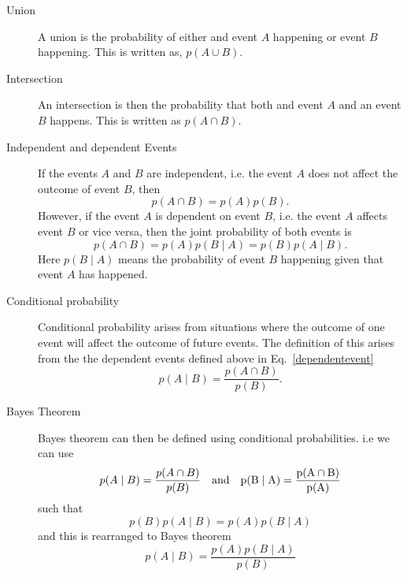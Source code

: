 \begin{description}
	\item [Union]
	A union is the probability of either and event $A$ happening or event $B$ happening. This is written as, $p(A \cup B)$.
	
	\item [Intersection]
	An intersection is then the probability that both and event $A$ and an event $B$ happens. This is written as $p(A \cap B)$.
	
	\item [Independent and dependent Events]
	If the events $A$ and $B$ are independent, i.e. the event $A$ does not affect the outcome of event $B$, then
	\begin{equation}
	p(A \cap B) = p(A)p(B).
	\end{equation}
	However, if the event $A$ is dependent on event $B$, i.e. the event $A$ affects event $B$ or vice versa, then the joint probability of both events is
	\begin{equation}
	\label{dependentevent}
	p(A \cap B) = p(A)p(B \mid A) = p(B)p(A \mid B).
	\end{equation}
	Here $p(B \mid A)$ means the probability of event $B$ happening given that event $A$ has happened.
	
	\item [Conditional probability]
	Conditional probability arises from situations where the outcome of one event will affect the outcome of future events.
	The definition of this arises from the the dependent events defined above in Eq.~\ref{dependentevent}
	\begin{equation}
	p(A \mid B) = \frac{p(A \cap B)}{p(B)}.
	\end{equation}
	
	\item [Bayes Theorem]
	Bayes theorem can then be defined using conditional probabilities. i.e we can use
	\begin{equation}
	p(A \mid B) = \frac{p(A \cap B)}{p(B)} \quad \rm{and} \quad p(B \mid A) = \frac{p(A \cap B)}{p(A)}
	\end{equation}
	such that
	\begin{equation}
	p(B)p(A \mid B) = p(A)p(B \mid A)
	\end{equation}
	and this is rearranged to Bayes theorem
	\begin{equation}
	p(A \mid B) = \frac{p(A)p(B \mid A)}{p(B)}
	\end{equation}
	
\end{description}

